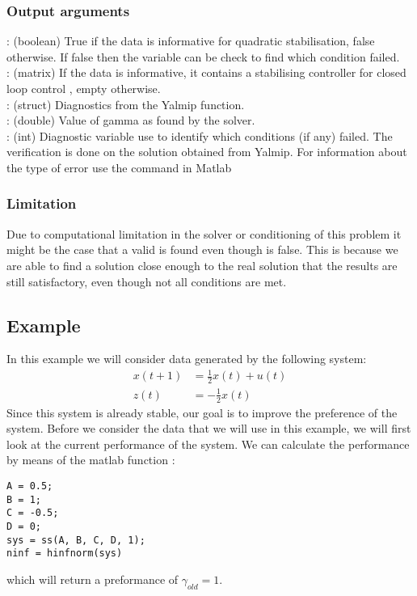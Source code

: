 \subsubsection*{Output arguments}
\textbf{}: (boolean) True if the data is informative for quadratic stabilisation, false otherwise. If false then the  variable can be check to find which condition failed. \\
\textbf{}: (matrix) If the data is informative, it contains a stabilising controller  for closed loop control , empty otherwise.\\
\textbf{}: (struct) Diagnostics from the Yalmip  function. \\
\textbf{}: (double) Value of gamma as found by the solver. \\
\textbf{}: (int) Diagnostic variable use to identify which conditions (if any) failed. The verification is done on the solution obtained from Yalmip. For information about the type of error use the  command in Matlab

\subsubsection*{Limitation}
Due to computational limitation in the solver or conditioning of this problem it might be the case that a valid  is found even though  is false. This is because we are able to find a solution close enough to the real solution that the results are still satisfactory, even though not all conditions are met. 

\subsection{Example}
In this example we will consider data generated by the following system:
\begin{align*}
	x(t+1) &= \frac{1}{2}x(t) + u(t) \\
	z(t)   &=  -\frac{1}{2}x(t)
\end{align*}
Since this system is already stable, our goal is to improve the preference of the system. Before we consider the data that we will use in this example, we will first look at the current performance of the system. We can calculate the performance by means of the matlab function :
\begin{lstlisting}
A = 0.5;
B = 1;
C = -0.5;
D = 0;
sys = ss(A, B, C, D, 1);
ninf = hinfnorm(sys)
\end{lstlisting}
which will return a preformance of $\gamma_{old} = 1$.
 
